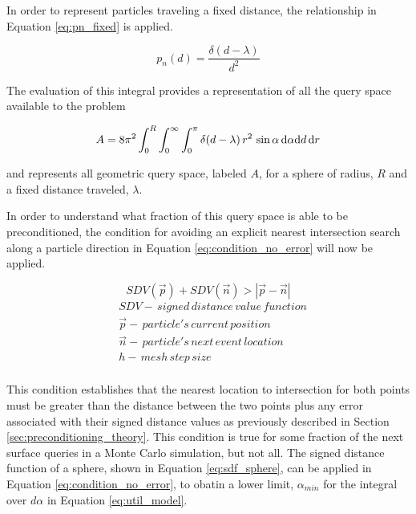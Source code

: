 In order to represent particles traveling a fixed distance, the relationship in
Equation \ref{eq:pn_fixed} is applied.

\begin{equation}
  \label{eq:pn_fixed}
  p_n(d) = \frac{\delta(d-\lambda)}{d^{2}}
\end{equation}

The evaluation of this integral provides a representation of all the query
space available to the problem

\begin{equation}
  \label{eq:A_fixed}
\small A = 8\pi^2  \int_{0}^{R}\int_{0}^{\infty}\int_{0}^{\pi} \delta(d-\lambda) \,
r^2 \, \sin{\alpha} \, \mathrm{d}\alpha \mathrm{d}d \, \mathrm{d}r
\end{equation}

and represents all geometric query space, labeled $A$, for a sphere of radius,
$R$ and a fixed distance traveled, $\lambda$.

In order to understand what fraction of this query space is able to be
preconditioned, the condition for avoiding an explicit nearest intersection
search along a particle direction in Equation \ref{eq:condition_no_error} will now be
applied.

\begin{equation}
  SDV(\vec{p}) + SDV(\vec{n}) > |\vec{p}-\vec{n}|
  \label{eq:condition_no_error}
\end{equation}
\begin{align*}
 &SDV - \, signed \, distance \, value \, function \\
 &\vec{p} - \, particle's \, current \, position \\
 &\vec{n} - \, particle's \, next \, event \, location \\
 &h - \, mesh \, step \, size \\
\end{align*}

This condition establishes that the nearest location to intersection for both
points must be greater than the distance between the two points plus any error
associated with their signed distance values as previously described in Section
\ref{sec:preconditioning_theory}. This condition is true for some fraction of
the next surface queries in a Monte Carlo simulation, but not all. The signed
distance function of a sphere, shown in Equation \ref{eq:sdf_sphere}, can be
applied in Equation \ref{eq:condition_no_error}, to obatin a lower limit,
$\alpha_{min}$ for the integral over $d\alpha$ in Equation \ref{eq:util_model}.

